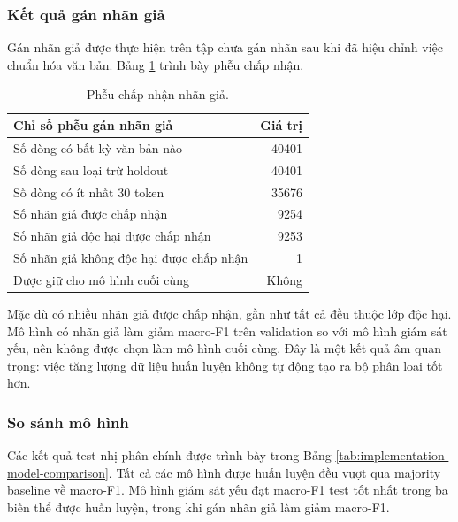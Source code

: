 \subsubsection{Kết quả gán nhãn giả}

Gán nhãn giả được thực hiện trên tập chưa gán nhãn sau khi đã hiệu chỉnh việc chuẩn hóa văn bản. Bảng \ref{tab:implementation-pseudo-labels} trình bày phễu chấp nhận.

\begin{table}[H]
\centering
\small
\renewcommand{\arraystretch}{1.25}
\begin{tabular}{|l|r|}
\hline
\textbf{Chỉ số phễu gán nhãn giả} & \textbf{Giá trị} \\
\hline
Số dòng có bất kỳ văn bản nào & 40401 \\
\hline
Số dòng sau loại trừ holdout & 40401 \\
\hline
Số dòng có ít nhất 30 token & 35676 \\
\hline
Số nhãn giả được chấp nhận & 9254 \\
\hline
Số nhãn giả độc hại được chấp nhận & 9253 \\
\hline
Số nhãn giả không độc hại được chấp nhận & 1 \\
\hline
Được giữ cho mô hình cuối cùng & Không \\
\hline
\end{tabular}
\caption{Phễu chấp nhận nhãn giả.}
\label{tab:implementation-pseudo-labels}
\end{table}

Mặc dù có nhiều nhãn giả được chấp nhận, gần như tất cả đều thuộc lớp độc hại. Mô hình có nhãn giả làm giảm macro-F1 trên validation so với mô hình giám sát yếu, nên không được chọn làm mô hình cuối cùng. Đây là một kết quả âm quan trọng: việc tăng lượng dữ liệu huấn luyện không tự động tạo ra bộ phân loại tốt hơn.

\subsubsection{So sánh mô hình}

Các kết quả test nhị phân chính được trình bày trong Bảng \ref{tab:implementation-model-comparison}. Tất cả các mô hình được huấn luyện đều vượt qua majority baseline về macro-F1. Mô hình giám sát yếu đạt macro-F1 test tốt nhất trong ba biến thể được huấn luyện, trong khi gán nhãn giả làm giảm macro-F1.

